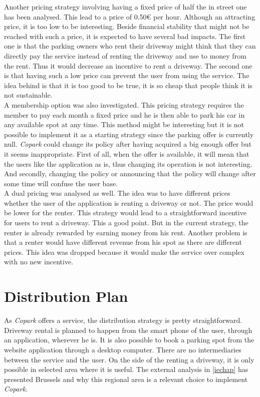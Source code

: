\documentclass[12pt,a4paper,oneside]{book}
\newcommand{\bp}{\textit{Copark}}
\begin{document}
Another pricing strategy involving having a fixed price of half the in street one has been analysed. This lead to a price of 0.50\euro{} per hour. Although an attracting price, it is too low to be interesting. Beside financial stability that might not be reached with such a price, it is expected to have several bad impacts. The first one is that the parking owners who rent their driveway might think that they can directly pay the service instead of renting the driveway and use to money from the rent. Thus it would decrease an incentive to rent a driveway. The second one is that having such a low price can prevent the user from using the service. The idea behind is that it is too good to be true, it is so cheap that people think it is not sustainable.\\

A membership option was also investigated. This pricing strategy requires the member to pay each month a fixed price and he is then able to park his car in any available spot at any time. This method might be interesting but it is not possible to implement it as a starting strategy since the parking offer is currently null. \bp{} could change its policy after having acquired a big enough offer but it seems inappropriate. First of all, when the offer is available, it will mean that the users like the application as is, thus changing its operation is not interesting. And secondly, changing the policy or announcing that the policy will change after some time will confuse the user base.\\

A dual pricing was analysed as well. The idea was to have different prices whether the user of the application is renting a driveway or not. The price would be lower for the renter. This strategy would lead to a straightforward incentive for users to rent a driveway. This a good point. But in the current strategy, the renter is already rewarded by earning money from his rent. Another problem is that a renter would have different revenue from his spot as there are different prices. This idea was dropped because it would make the service over complex with no new incentive.

\section{Distribution Plan}

As \bp{} offers a service, the distribution strategy is pretty straightforward. Driveway rental is planned to happen from the smart phone of the user, through an application, wherever he is. It is also possible to book a parking spot from the website application through a desktop computer. There are no intermediaries between the service and the user. On the side of the renting a driveway, it is only possible in selected area where it is useful. The external analysis in \autoref{iechap} has presented Brussels and why this regional area is a relevant choice to implement \bp{}.
\end{document}
